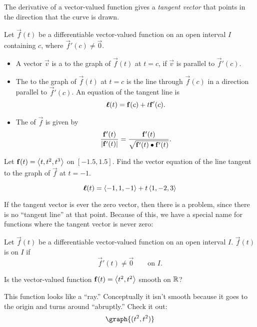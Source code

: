 \documentclass{ximera}
\begin{document}
The derivative of a vector-valued function gives a \textit{tangent
  vector} that points in the direction that the curve is drawn.

\begin{definition}
Let $\vec{f}(t)$ be a differentiable vector-valued function on an open
interval $I$ containing $c$, where $\vec{f}'(c)\neq \vec{0}$.
\begin{itemize}
\item A vector $\vec v$ is a  to the graph of
  $\vec{f}(t)$ at $t=c$, if $\vec v$ is parallel to $\vec{f}'(c)$.
\item The  to the graph of $\vec f(t)$ at $t=c$
  is the line through $\vec f(c)$ in a direction parallel to
  $\vec{f}'(c)$. An equation of the tangent line is
  \[
  \boldsymbol{\ell}(t) = \mathbf f(c) + t\mathbf{f}'(c).
  \]
\item The  of $\vec{f}$ is given by
  \[
  \frac{\mathbf{f}'(t)}{|\mathbf{f}'(t)|} = \frac{\mathbf{f}'(t)}{\sqrt{\mathbf{f}'(t)\bullet \mathbf{f}'(t)}}.
  \]
\end{itemize}
\end{definition}

\begin{question}
  Let $\mathbf{f}(t) = \left\langle t,t^2,t^3\right\rangle$ on $[-1.5,1.5]$.  Find the
  vector equation of the line tangent to the graph of $\vec f$ at
  $t=-1$.
  \begin{prompt}
    \[
    \boldsymbol{\ell}(t) = \left\langle -1,1,-1\right\rangle + t\left\langle 1,-2,3\right\rangle
    \]
  \end{prompt}
\end{question}

If the tangent vector is ever the zero vector, then there is a
problem, since there is no ``tangent line'' at that point. Because of
this, we have a special name for functions where the tangent vector is never zero:

\begin{definition}
Let $\vec{f}(t)$ be a differentiable vector-valued function on an open
interval $I$. $\vec f(t)$ is  on $I$ if
\[
\vec{f}'(t)\neq\vec{0}\qquad\text{on $I$.} 
\]
\end{definition}

\begin{question}
  Is the vector-valued function $\mathbf{f}(t) = \left\langle t^2,t^2\right\rangle$ smooth on
  $\mathbb R$?
  \begin{multipleChoice}
  \end{multipleChoice}
  \begin{feedback}
    This function looks like a ``ray.'' Conceptually it isn't smooth
    because it goes to the origin and turns around ``abruptly.'' Check it out:
    \[
    \graph{(t^2,t^2)}
    \]
  \end{feedback}
\end{question}
\end{document}
